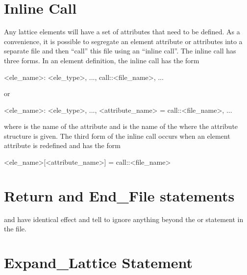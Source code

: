 {{%
\section{Inline Call}
\label{s:call.inline}

Any lattice elements will have a set of attributes that need to be defined.
As a convenience, it is possible to segregate an element attribute or attributes
into a separate file and then ``call'' this file using an
``inline call''. The inline call has three forms. In an element definition,
the inline call has the form
\begin{example}
  <ele_name>: <ele_type>, ..., call::<file_name>, ...
\end{example}
or
\begin{example}
  <ele_name>: <ele_type>, ..., <attribute_name> = call::<file_name>, ...
\end{example}
where  is the name of the attribute and
 is the name of the where the attribute structure is
given.  The third form of the inline call occurs when an element
attribute is redefined and has the form
\begin{example}
  <ele_name>[<attribute_name>] = call::<file_name>
\end{example}



\section{Return and End_File statements}

 and  have identical effect and tell \bmad to
ignore anything beyond the  or  statement in
the file.

\section{Expand_Lattice Statement}
\label{s:expand}

}}
